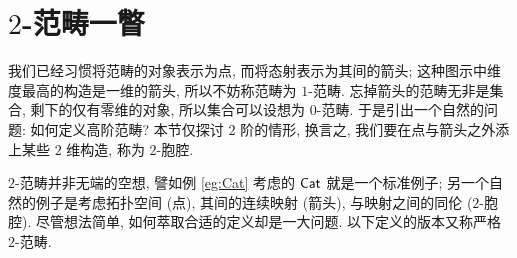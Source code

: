 \section{\texorpdfstring{$2$}{2}-范畴一瞥}\label{sec:2-cat}
我们已经习惯将范畴的对象表示为点, 而将态射表示为其间的箭头; 这种图示中维度最高的构造是一维的箭头, 所以不妨称范畴为 $1$-范畴. 忘掉箭头的范畴无非是集合, 剩下的仅有零维的对象, 所以集合可以设想为 $0$-范畴. 于是引出一个自然的问题: 如何定义高阶范畴? 本节仅探讨 $2$ 阶的情形, 换言之, 我们要在点与箭头之外添上某些 $2$ 维构造, 称为 $2$-胞腔.

$2$-范畴并非无端的空想, 譬如例 \ref{eg:Cat} 考虑的 $\mathsf{Cat}$ 就是一个标准例子; 另一个自然的例子是考虑拓扑空间 (点), 其间的连续映射 (箭头), 与映射之间的同伦 ($2$-胞腔). 尽管想法简单, 如何萃取合适的定义却是一大问题. 以下定义的版本又称严格 $2$-范畴.

